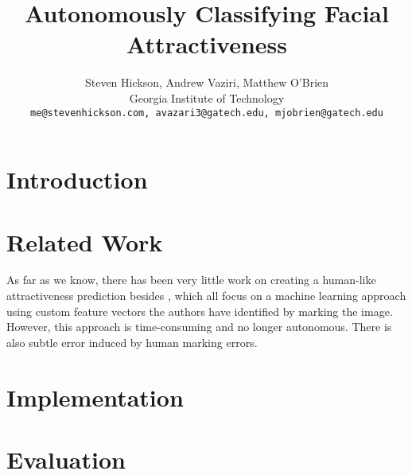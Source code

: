 \documentclass[10pt,twocolumn,letterpaper]{article}
\begin{document}
\title{Autonomously Classifying Facial Attractiveness}

\author{Steven Hickson, Andrew Vaziri, Matthew O'Brien \\
Georgia Institute of Technology\\
{\tt\small me@stevenhickson.com, avazari3@gatech.edu, mjobrien@gatech.edu}
}

\maketitle


\section{Introduction}
 
\section{Related Work}
As far as we know, there has been very little work on creating a human-like attractiveness prediction besides \cite{eisenthal2006facial, kagian2006humanlike, kagian2008machine}, which all focus on a machine learning approach using custom feature vectors the authors have identified by marking the image. However, this approach is time-consuming and no longer autonomous. There is also subtle error induced by human marking errors.

\section{Implementation}

\section{Evaluation}

\cite{turk1991eigenfaces, belhumeur1997eigenfaces, yang2002kernel, guo2000face}


{\small


}
\end{document}
